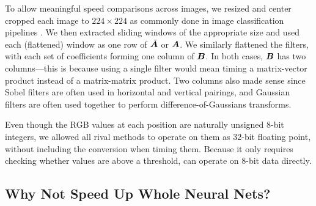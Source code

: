 To allow meaningful speed comparisons across images, we resized and center cropped each image to $224 \times 224$ as commonly done in image classification pipelines \cite{resNet,resnet2,densenet}. We then extracted sliding windows of the appropriate size and used each (flattened) window as one row of $\tilde{\bm{A}}$ or $\bm{A}$. We similarly flattened the filters, with each set of coefficients forming one column of $\bm{B}$. In both cases, $\bm{B}$ has two columns---this is because using a single filter would mean timing a matrix-vector product instead of a matrix-matrix product. Two columns also made sense since Sobel filters are often used in horizontal and vertical pairings, and Gaussian filters are often used together to perform difference-of-Gaussians transforms.

Even though the RGB values at each position are naturally unsigned 8-bit integers, we allowed all rival methods to operate on them as 32-bit floating point, without including the conversion when timing them. Because it only requires checking whether values are above a threshold, \oursp can operate on 8-bit data directly.

\subsection{Why Not Speed Up Whole Neural Nets?}

